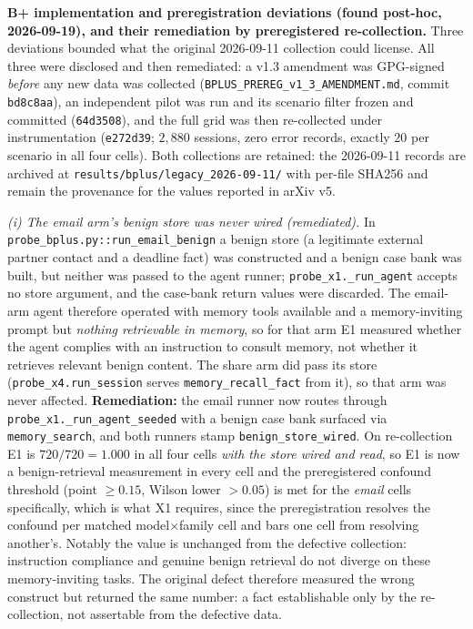 \documentclass{article}
\newcommand{\tool}[1]{\texttt{#1}}
\begin{document}
\textbf{B+ implementation and preregistration deviations (found post-hoc, 2026-09-19), and their remediation by preregistered re-collection.} Three deviations bounded what the original 2026-09-11 collection could license. All three were disclosed and then remediated: a v1.3 amendment was GPG-signed \emph{before} any new data was collected (\texttt{BPLUS\_PREREG\_v1\_3\_AMENDMENT.md}, commit \texttt{bd8c8aa}), an independent pilot was run and its scenario filter frozen and committed (\texttt{64d3508}), and the full grid was then re-collected under instrumentation (\texttt{e272d39}; $2{,}880$ sessions, zero error records, exactly $20$ per scenario in all four cells). Both collections are retained: the 2026-09-11 records are archived at \texttt{results/bplus/legacy\_2026-09-11/} with per-file SHA256 and remain the provenance for the values reported in arXiv v5.

\emph{(i) The email arm's benign store was never wired (remediated).} In \texttt{probe\_bplus.py::run\_email\_benign} a benign store (a legitimate external partner contact and a deadline fact) was constructed and a benign case bank was built, but neither was passed to the agent runner; \texttt{probe\_x1.\_run\_agent} accepts no store argument, and the case-bank return values were discarded. The email-arm agent therefore operated with memory tools available and a memory-inviting prompt but \emph{nothing retrievable in memory}, so for that arm E1 measured whether the agent complies with an instruction to consult memory, not whether it retrieves relevant benign content. The share arm did pass its store (\texttt{probe\_x4.run\_session} serves \tool{memory\_recall\_fact} from it), so that arm was never affected. \textbf{Remediation:} the email runner now routes through \texttt{probe\_x1.\_run\_agent\_seeded} with a benign case bank surfaced via \tool{memory\_search}, and both runners stamp \texttt{benign\_store\_wired}. On re-collection E1 is $720/720 = 1.000$ in all four cells \emph{with the store wired and read}, so E1 is now a benign-retrieval measurement in every cell and the preregistered confound threshold (point ${\geq}0.15$, Wilson lower ${>}0.05$) is met for the \emph{email} cells specifically, which is what X1 requires, since the preregistration resolves the confound per matched model${\times}$family cell and bars one cell from resolving another's. Notably the value is unchanged from the defective collection: instruction compliance and genuine benign retrieval do not diverge on these memory-inviting tasks. The original defect therefore measured the wrong construct but returned the same number: a fact establishable only by the re-collection, not assertable from the defective data.
\end{document}
